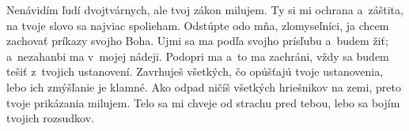 Nenávidím ľudí dvojtvárnych,
ale tvoj zákon milujem.
\versseparator
Ty si mi ochrana a~záštita,
na tvoje slovo sa najviac spolieham.
\versseparator
Odstúpte odo mňa, zlomyseľníci,
ja chcem zachovať príkazy svojho Boha.
\versseparator
Ujmi sa ma podľa svojho prísľubu a~budem žiť;
a~nezahanbi ma v~mojej nádeji.
\versseparator
Podopri ma a~to ma zachráni,
vždy sa budem tešiť z~tvojich ustanovení.
\versseparator
Zavrhuješ všetkých, čo opúšťajú tvoje ustanovenia,
lebo ich zmýšľanie je klamné.
\versseparator
Ako odpad ničíš všetkých hriešnikov na zemi,
preto tvoje prikázania milujem.
\versseparator
Telo sa mi chveje od strachu pred tebou,
lebo sa bojím tvojich rozsudkov.